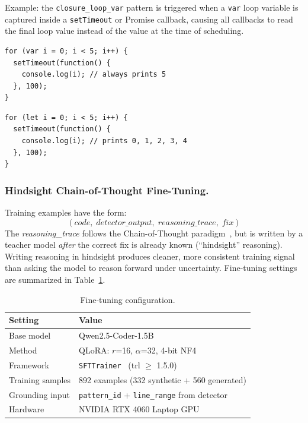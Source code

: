 \documentclass[runningheads]{llncs}
\begin{document}
Example: the \texttt{closure\_loop\_var} pattern is triggered when a
\texttt{var} loop variable is captured inside a \texttt{setTimeout} or
Promise callback, causing all callbacks to read the final loop value
instead of the value at the time of scheduling.

\begin{lstlisting}[style=js, caption={Bug: \texttt{var i} shared across all callbacks.}]
for (var i = 0; i < 5; i++) {
  setTimeout(function() {
    console.log(i); // always prints 5
  }, 100);
}
\end{lstlisting}

\begin{lstlisting}[style=js, caption={Fix: \texttt{let i} creates a separate binding per iteration.}]
for (let i = 0; i < 5; i++) {
  setTimeout(function() {
    console.log(i); // prints 0, 1, 2, 3, 4
  }, 100);
}
\end{lstlisting}

\subsubsection{Hindsight Chain-of-Thought Fine-Tuning.}
\label{sec:design:finetuning}

Training examples have the form:
\[
  (\textit{code},\; \textit{detector\_output},\; \textit{reasoning\_trace},\; \textit{fix})
\]
The \textit{reasoning\_trace} follows the Chain-of-Thought
paradigm~\cite{cot}, but is written by a teacher model \emph{after}
the correct fix is already known (``hindsight'' reasoning).
Writing reasoning in hindsight produces cleaner, more consistent training
signal than asking the model to reason forward under uncertainty.
Fine-tuning settings are summarized in Table~\ref{tab:finetune}.

\begin{table}[H]
  \centering
  \caption{Fine-tuning configuration.}
  \label{tab:finetune}
  \begin{tabular}{@{}ll@{}}
    \toprule
    \textbf{Setting} & \textbf{Value} \\
    \midrule
    Base model         & Qwen2.5-Coder-1.5B~\cite{qwen25coder} \\
    Method             & QLoRA: $r$=16, $\alpha$=32, 4-bit NF4 \\
    Framework          & \texttt{SFTTrainer}~\cite{trl} (trl $\geq$ 1.5.0) \\
    Training samples   & 892 examples (332 synthetic + 560 generated) \\
    Grounding input    & \texttt{pattern\_id} + \texttt{line\_range} from detector \\
    Hardware           & NVIDIA RTX 4060 Laptop GPU \\
    \bottomrule
  \end{tabular}
\end{table}
\end{document}
